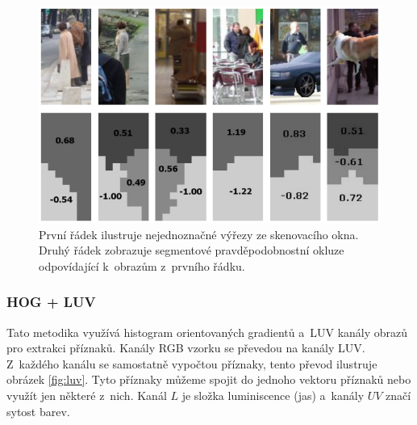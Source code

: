 \begin{figure}[H]
\centering
\includegraphics[width=.6\linewidth]{figures/hoglbp_obr}
\caption{První řádek ilustruje nejednoznačné výřezy ze skenovacího okna. Druhý řádek zobrazuje segmentové pravděpodobnostní okluze odpovídající k~obrazům z~prvního řádku.\cite{hoglpb}}
\label{fig:hoglbp}
\end{figure}

\subsubsection*{HOG + LUV}
Tato metodika \cite{hogluv} využívá histogram orientovaných gradientů a~LUV kanály obrazů pro extrakci příznaků. Kanály RGB vzorku se převedou na kanály LUV. Z~každého kanálu se samostatně vypočtou příznaky, tento převod ilustruje obrázek \ref{fig:luv}. Tyto příznaky můžeme spojit do jednoho vektoru příznaků nebo využít jen některé z~nich. Kanál $L$ je složka luminiscence (jas) a~kanály $UV$ značí sytost barev. 

